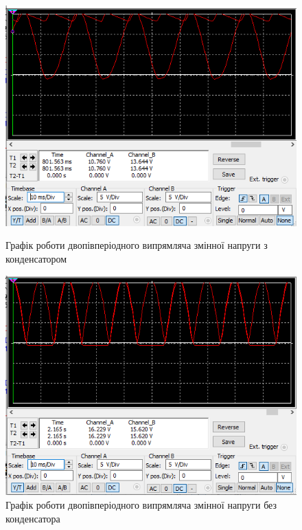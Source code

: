 \documentclass{article}
\begin{document}
\begin{normalsize}
	\begin{figure}[H]
		\begin{minipage}[t]{0.48\textwidth}
			\centering
			\includegraphics[width=\textwidth]{41}
			\caption{Графік роботи двопівперіодного випрямляча змінної напруги з конденсатором}
		\end{minipage}
		\hfill
		\begin{minipage}[t]{0.48\textwidth}
			\centering
			\includegraphics[width=\textwidth]{43}
			\caption{Графік роботи двопівперіодного випрямляча змінної напруги без конденсатора}
		\end{minipage}
	\end{figure}
	

\end{normalsize}
\end{document}
